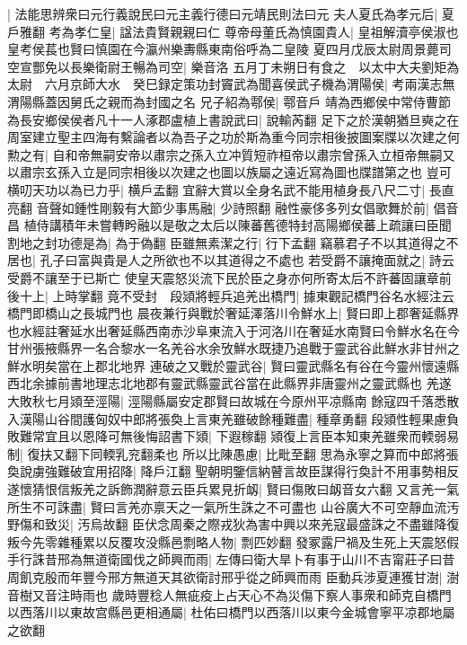 |{
	法能思辨衆曰元行義說民曰元主義行德曰元靖民則法曰元}
夫人夏氏為孝元后|{
	夏戶雅翻}
考為孝仁皇|{
	諡法貴賢親親曰仁}
尊帝母董氏為慎園貴人|{
	皇祖解瀆亭侯淑也皇考侯萇也賢曰慎園在今瀛州樂夀縣東南俗呼為二皇陵}
夏四月戊辰太尉周景薨司空宣酆免以長樂衛尉王暢為司空|{
	樂音洛}
五月丁未朔日有食之　以太中大夫劉矩為太尉　六月京師大水　癸巳録定策功封竇武為聞喜侯武子機為渭陽侯|{
	考兩漢志無渭陽縣蓋因舅氏之親而為封國之名}
兄子紹為鄠侯|{
	鄠音戶}
靖為西鄉侯中常侍曹節為長安鄉侯侯者凡十一人涿郡盧植上書說武曰|{
	說輸芮翻}
足下之於漢朝猶旦奭之在周室建立聖主四海有繫論者以為吾子之功於斯為重今同宗相後披圖案牒以次建之何勲之有|{
	自和帝無嗣安帝以肅宗之孫入立冲質短祚桓帝以肅宗曾孫入立桓帝無嗣又以肅宗玄孫入立是同宗相後以次建之也圖以族屬之遠近寫為圖也牒譜第之也}
豈可横叨天功以為已力乎|{
	横戶孟翻}
宜辭大賞以全身名武不能用植身長八尺二寸|{
	長直亮翻}
音聲如鍾性剛毅有大節少事馬融|{
	少詩照翻}
融性豪侈多列女倡歌舞於前|{
	倡音昌}
植侍講積年未嘗轉盻融以是敬之太后以陳蕃舊德特封高陽鄉侯蕃上疏讓曰臣聞割地之封功德是為|{
	為于偽翻}
臣雖無素潔之行|{
	行下孟翻}
竊慕君子不以其道得之不居也|{
	孔子曰富與貴是人之所欲也不以其道得之不處也}
若受爵不讓掩面就之|{
	詩云受爵不讓至于已斯亡}
使皇天震怒災流下民於臣之身亦何所寄太后不許蕃固讓章前後十上|{
	上時掌翻}
竟不受封　段熲將輕兵追羌出橋門|{
	據東觀記橋門谷名水經注云橋門即橋山之長城門也}
晨夜兼行與戰於奢延澤落川令鮮水上|{
	賢曰即上郡奢延縣界也水經註奢延水出奢延縣西南赤沙阜東流入于河洛川在奢延水南賢曰令鮮水名在今甘州張掖縣界一名合黎水一名羌谷水余攷鮮水既捷乃追戰于靈武谷此鮮水非甘州之鮮水明矣當在上郡北地界}
連破之又戰於靈武谷|{
	賢曰靈武縣名有谷在今靈州懷遠縣西北余據前書地理志北地郡有靈武縣靈武谷當在此縣界非唐靈州之靈武縣也}
羌遂大敗秋七月熲至涇陽|{
	涇陽縣屬安定郡賢曰故城在今原州平凉縣南}
餘寇四千落悉散入漢陽山谷間護匈奴中郎將張奐上言東羌雖破餘種難盡|{
	種章勇翻}
段熲性輕果慮負敗難常宜且以恩降可無後悔詔書下熲|{
	下遐稼翻}
熲復上言臣本知東羌雖衆而輭弱易制|{
	復扶又翻下同輭乳兖翻柔也}
所以比陳愚慮|{
	比毗至翻}
思為永寧之算而中郎將張奐說虜強難破宜用招降|{
	降戶江翻}
聖朝明鑒信納瞽言故臣謀得行奐計不用事勢相反遂懷猜恨信叛羌之訴飾潤辭意云臣兵累見折衂|{
	賢曰傷敗曰衂音女六翻}
又言羌一氣所生不可誅盡|{
	賢曰言羌亦禀天之一氣所生誅之不可盡也}
山谷廣大不可空靜血流汚野傷和致災|{
	汚烏故翻}
臣伏念周秦之際戎狄為害中興以來羌寇最盛誅之不盡雖降復叛今先零雜種累以反覆攻没縣邑剽略人物|{
	剽匹妙翻}
發冢露尸禍及生死上天震怒假手行誅昔邢為無道衛國伐之師興而雨|{
	左傳曰衛大旱卜有事于山川不吉甯莊子曰昔周飢克殷而年豐今邢方無道天其欲衛討邢乎從之師興而雨}
臣動兵涉夏連獲甘澍|{
	澍音樹又音注時雨也}
歲時豐稔人無疵疫上占天心不為災傷下察人事衆和師克自橋門以西落川以東故宫縣邑更相通屬|{
	杜佑曰橋門以西落川以東今金城會寧平凉郡地屬之欲翻}
